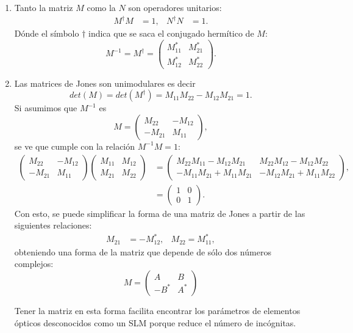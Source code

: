 \begin{enumerate}
\item Tanto la matriz $M$ como la $N$ son operadores unitarios:
  \begin{align*}
    M^{\dagger} M &= 1,& N^{\dagger}N &=1.
  \end{align*}
Dónde el símbolo $\dagger$ indica que se saca el conjugado hermítico
de $M$:
\begin{equation*}
M^{-1}=M^{\dagger}=
  \begin{pmatrix}
      M_{11}^*&M_{21}^*\\M_{12}^* & M_{22}^*
    \end{pmatrix}.
\end{equation*}
\item Las matrices de Jones son unimodulares es decir
$$det(M) = det(M^{\dagger})  = M_{11}M_{22}-M_{12}M_{21} = 1.$$ 
Si asumimos que $M^{-1}$ es
\begin{equation*}
  M=
  \begin{pmatrix}
    M_{22}&-M_{12}\\-M_{21}&M_{11}
  \end{pmatrix},
\end{equation*}
se ve que cumple con la relación $M^{-1}M = 1$:
\begin{align*}
    \begin{pmatrix}
    M_{22}&-M_{12}\\-M_{21}&M_{11}
  \end{pmatrix}
\begin{pmatrix}
      M_{11}&M_{12}\\M_{21} & M_{22}
    \end{pmatrix}
&=
    \begin{pmatrix}
 M_{22}M_{11}-M_{12}M_{21}     & M_{22}M_{12}-M_{12}M_{22}\\
-M_{11}M_{21}+M_{11}M_{21}    & -M_{12}M_{21} + M_{11}M_{22} 
    \end{pmatrix},\\
&=
\begin{pmatrix}
  1 &0\\0&1
\end{pmatrix}.
\end{align*}
Con esto, se puede simplificar la forma de una matriz de Jones a
partir de las siguientes relaciones:
\begin{align*}
  M_{21} &= - M_{12}^*, & M_{22} = M_{11}^*,
\end{align*}
obteniendo una forma de la matriz que depende de sólo dos números
complejos:
\begin{equation}
  M=
  \begin{pmatrix}
    A & B \\-B^* & A^*
  \end{pmatrix}
\label{eq:general_jones_matrix}
\end{equation}

Tener la matriz en esta forma facilita encontrar los parámetros de elementos
ópticos desconocidos como un SLM porque reduce el número de incógnitas.

\end{enumerate}

